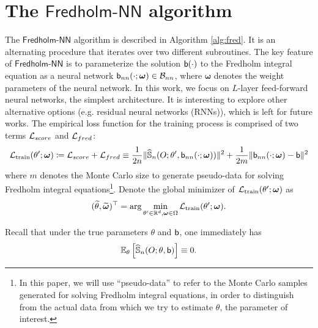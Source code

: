 \documentclass[11pt]{article}
\def\fred{\mathsf{Fredholm\mbox{-}NN}}
\def\train{\mathrm{train}}
\begin{document}
\section{The $\fred$ algorithm}
\label{sec:fred}
The $\fred$ algorithm is described in Algorithm \ref{alg:fred}. It is an alternating procedure that iterates over two different subroutines. The key feature of $\fred$ is to parameterize the solution ${\mathsf{b}} (\cdot)$ to the Fredholm integral equation as a neural network ${\mathsf{b}}_{nn} (\cdot; \bm{\omega}) \in {\mathcal{B}}_{nn}$, where $\bm{\omega}$ denotes the weight parameters of the neural network. In this work, we focus on $L$-layer feed-forward neural networks, the simplest architecture. It is interesting to explore other alternative options (e.g. residual neural networks (RNNs)), which is left for future works. The empirical loss function for the training process is comprised of two terms ${\mathcal{L}}_{score}$ and ${\mathcal{L}}_{fred}$:
\begin{equation}
\label{loss}
\calL_{\train} (\theta'; \bm{\omega}) \coloneqq \calL_{score} + \calL_{fred} \equiv \frac{1}{2 n} \Vert \hat{\bbS}_{n} (O; \theta', \sfb_{nn} (\cdot; \bm{\omega})) \Vert^{2} + \frac{1}{2 m} \Vert \sfb_{nn} (\cdot; \bm{\omega}) - \sfb \Vert^{2}
\end{equation}
where $m$ denotes the Monte Carlo size to generate pseudo-data for solving Fredholm integral equations\footnote{In this paper, we will use ``pseudo-data'' to refer to the Monte Carlo samples generated for solving Fredholm integral equations, in order to distinguish from the actual data from which we try to estimate $\theta$, the parameter of interest.}. Denote the global minimizer of $\calL_{\train} (\theta'; \bm{\omega})$ as
\begin{equation}
(\tilde{\theta}, \tilde{\bm{\omega}})^{\top} = \arg \min_{\theta' \in \bbR^{d}, \bm{\omega} \in \Omega} \calL_{\train} (\theta'; \bm{\omega}).
\end{equation}

Recall that under the true parameters $\theta$ and ${\mathsf{b}}$, one immediately has
\begin{align*}
{\mathbb{E}}_{\theta} \left[ \widehat{{\mathbb{S}}}_{n} (O; \theta, {\mathsf{b}}) \right] \equiv 0.
\end{align*}

\end{document}
